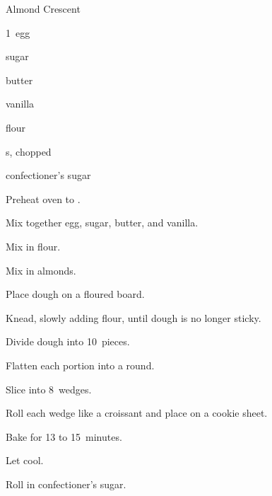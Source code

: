 \begin{recipe}{Almond Crescent}{}{}

\begin{ingredients}
\item 1~egg
\item \C{\twothird} sugar
\item {} butter
\item {} vanilla
\item {} flour
\item {} s, chopped
\item confectioner's sugar
\end{ingredients}

\begin{directions}
\item Preheat oven to .
\item Mix together egg, sugar, butter, and vanilla.
\item Mix in flour.
\item Mix in almonds.
\item Place dough on a floured board.
\item Knead, slowly adding flour, until dough is no longer sticky.
\item Divide dough into 10~pieces.
\item Flatten each portion into a round.
\item Slice into 8~wedges.
\item Roll each wedge like a croissant and place on a cookie sheet.
\item Bake for 13 to 15~minutes.
\item Let cool.
\item Roll in confectioner's sugar.
\end{directions}

\end{recipe}
